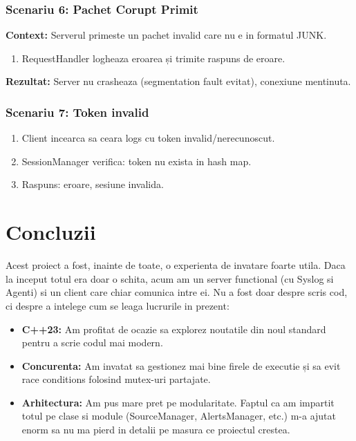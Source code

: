\documentclass[runningheads]{llncs}
\begin{document}
\subsubsection{Scenariu 6: Pachet Corupt Primit}
\textbf{Context:} Serverul primeste un pachet invalid care nu e in formatul JUNK.
\begin{enumerate}
    \item RequestHandler logheaza eroarea și trimite raspuns de eroare.
\end{enumerate}
\textbf{Rezultat:} Server nu crasheaza (segmentation fault evitat), conexiune mentinuta.

\subsubsection{Scenariu 7: Token invalid}
\begin{enumerate}
    \item Client incearca sa ceara logs cu token invalid/nerecunoscut.
    \item SessionManager verifica: token nu exista in hash map.
    \item Raspuns: eroare, sesiune invalida.
\end{enumerate}

\section{Concluzii}

Acest proiect a fost, inainte de toate, o experienta de invatare foarte utila. Daca la inceput totul era doar o schita, acum am un server functional (cu Syslog si Agenti) si un client care chiar comunica intre ei.
Nu a fost doar despre scris cod, ci despre a intelege cum se leaga lucrurile in prezent:
\begin{itemize}
    \item \textbf{C++23:} Am profitat de ocazie sa explorez noutatile din noul standard pentru a scrie codul mai modern.
    \item \textbf{Concurenta:} Am invatat sa gestionez mai bine firele de executie și sa evit race conditions folosind mutex-uri partajate.
    \item \textbf{Arhitectura:} Am pus mare pret pe modularitate. Faptul ca am impartit totul pe clase si module (SourceManager, AlertsManager, etc.) m-a ajutat enorm sa nu ma pierd in detalii pe masura ce proiectul crestea.
\end{itemize}
\end{document}
